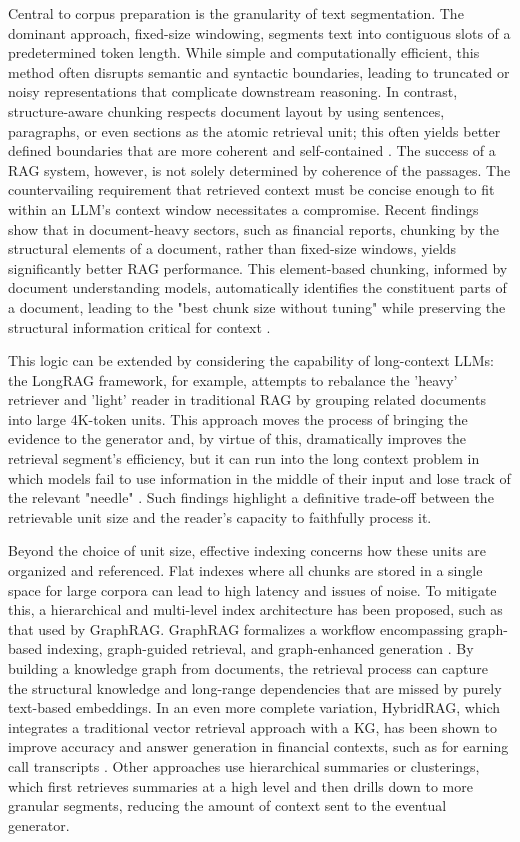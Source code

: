 \documentclass[11pt,a4paper]{article}
\begin{document}
Central to corpus preparation is the granularity of text segmentation. The dominant approach, fixed-size windowing, segments text into contiguous slots of a predetermined token length. While simple and computationally efficient, this method often disrupts semantic and syntactic boundaries, leading to truncated or noisy representations that complicate downstream reasoning. In contrast, structure-aware chunking respects document layout by using sentences, paragraphs, or even sections as the atomic retrieval unit; this often yields better defined boundaries that are more coherent and self-contained \cite{arxiv:2402.05131v3}. The success of a RAG system, however, is not solely determined by coherence of the passages. The countervailing requirement that retrieved context must be concise enough to fit within an LLM's context window necessitates a compromise. Recent findings show that in document-heavy sectors, such as financial reports, chunking by the structural elements of a document, rather than fixed-size windows, yields significantly better RAG performance. This element-based chunking, informed by document understanding models, automatically identifies the constituent parts of a document, leading to the "best chunk size without tuning" while preserving the structural information critical for context \cite{arxiv:2402.05131v3}. 

This logic can be extended by considering the capability of long-context LLMs: the LongRAG framework, for example, attempts to rebalance the 'heavy' retriever and 'light' reader in traditional RAG by grouping related documents into large 4K-token units. This approach moves the process of bringing the evidence to the generator and, by virtue of this, dramatically improves the retrieval segment's efficiency, but it can run into the long context problem in which models fail to use information in the middle of their input and lose track of the relevant "needle" \cite{arxiv:2406.15319v3}. Such findings highlight a definitive trade-off between the retrievable unit size and the reader's capacity to faithfully process it.

Beyond the choice of unit size, effective indexing concerns how these units are organized and referenced. Flat indexes where all chunks are stored in a single space for large corpora can lead to high latency and issues of noise. To mitigate this, a hierarchical and multi-level index architecture has been proposed, such as that used by GraphRAG. GraphRAG formalizes a workflow encompassing graph-based indexing, graph-guided retrieval, and graph-enhanced generation \cite{arxiv:2408.08921v2}. By building a knowledge graph from documents, the retrieval process can capture the structural knowledge and long-range dependencies that are missed by purely text-based embeddings. In an even more complete variation, HybridRAG, which integrates a traditional vector retrieval approach with a KG, has been shown to improve accuracy and answer generation in financial contexts, such as for earning call transcripts \cite{arxiv:2408.04948v1}. Other approaches use hierarchical summaries or clusterings, which first retrieves summaries at a high level and then drills down to more granular segments, reducing the amount of context sent to the eventual generator.
\end{document}
